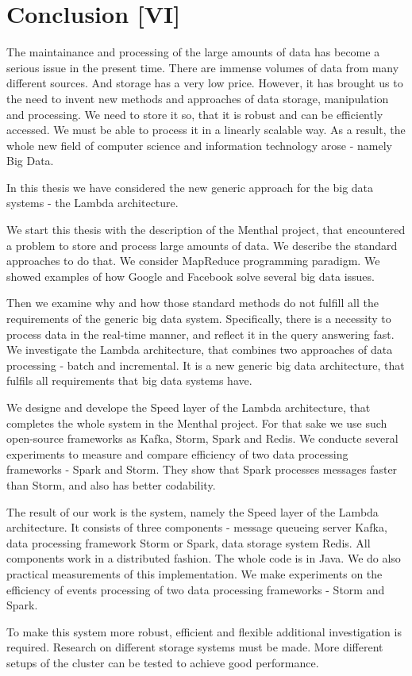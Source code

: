 \chapter{Conclusion [VI]}
\label{chap:conclusion}

The maintainance and processing of the large amounts of data has become a serious issue in the present time.
There are immense volumes of data from many different sources.
And storage has a very low price.
However, it has brought us to the need to invent new methods and approaches of data storage, manipulation and processing.
We need to store it so, that it is robust and can be efficiently accessed.
We must be able to process it in a linearly scalable way.
As a result, the whole new field of computer science and information technology arose - namely Big Data.

In this thesis we have considered the new generic approach for the big data systems - the Lambda architecture.

We start this thesis with the description of the Menthal project, that encountered a problem to store and process large amounts of data.
We describe the standard approaches to do that.
We consider MapReduce programming paradigm.
We showed examples of how Google and Facebook solve several big data issues.

Then we examine why and how those standard methods do not fulfill all the requirements of the generic big data system.
Specifically, there is a necessity to process data in the real-time manner, and reflect it in the query answering fast.
We investigate the Lambda architecture, that combines two approaches of data processing - batch and incremental.
It is a new generic big data architecture, that fulfils all requirements that big data systems have.

We designe and develope the Speed layer of the Lambda architecture, that completes the whole system in the Menthal project.
For that sake we use such open-source frameworks as Kafka, Storm, Spark and Redis.
We conducte several experiments to measure and compare efficiency of two data processing frameworks - Spark and Storm.
They show that Spark processes messages faster than Storm, and also has better codability.

The result of our work is the system, namely the Speed layer of the Lambda architecture.
It consists of three components - message queueing server Kafka, data processing framework Storm or Spark, data storage system Redis.
All components work in a distributed fashion.
The whole code is in Java. 
We do also practical measurements of this implementation.
We make experiments on the efficiency of events processing of two data processing frameworks - Storm and Spark.

To make this system more robust, efficient and flexible additional investigation is required.
Research on different storage systems must be made.
More different setups of the cluster can be tested to achieve good performance.